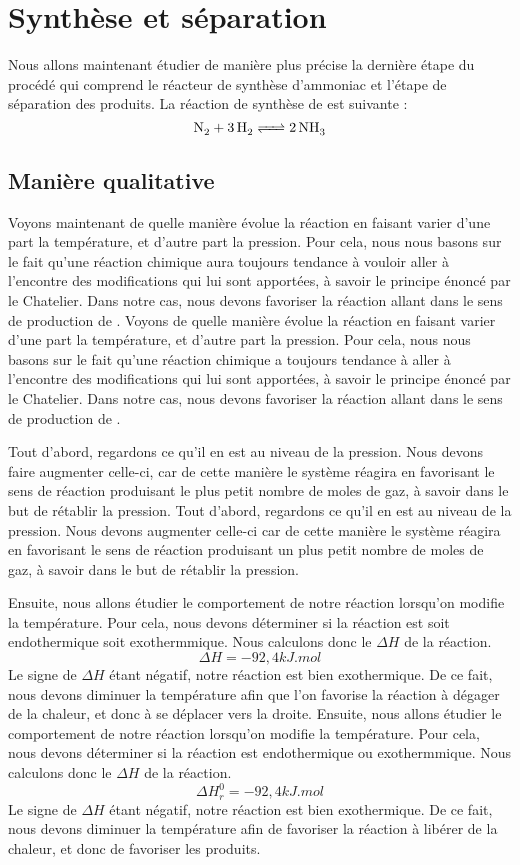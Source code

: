 \documentclass[10pt,a4paper]{article}
\begin{document}
\section{Synthèse  et séparation}

Nous allons maintenant étudier de manière plus précise la dernière étape du procédé qui comprend le réacteur de synthèse d’ammoniac et l'étape de séparation des produits.
La réaction de synthèse de  est suivante :
$$ \ce{N_2 + 3H2 <=> 2NH3}$$

\subsection{Manière qualitative}
Voyons maintenant de quelle manière évolue la réaction en faisant varier d'une part la température, et d'autre part la pression. Pour cela, nous nous basons sur le fait qu'une réaction chimique aura toujours tendance à vouloir aller à l'encontre des modifications qui lui sont apportées, à savoir le principe énoncé par le Chatelier. Dans notre cas, nous devons favoriser la réaction allant dans le sens de production de .
Voyons de quelle manière évolue la réaction en faisant varier d'une part la température, et d'autre part la pression. Pour cela, nous nous basons sur le fait qu'une réaction chimique a toujours tendance à   aller à l'encontre des modifications qui lui sont apportées, à savoir le principe énoncé par le Chatelier. Dans notre cas, nous devons favoriser la réaction allant dans le sens de production de .

Tout d'abord, regardons ce qu'il en est au niveau de la pression. Nous devons faire augmenter celle-ci, car de cette manière le système réagira en favorisant le sens de réaction produisant le plus petit nombre de moles de gaz, à savoir  dans le but de rétablir la pression. 
Tout d'abord, regardons ce qu'il en est au niveau de la pression. Nous devons augmenter celle-ci car de cette manière le système réagira en favorisant le sens de réaction produisant un plus petit nombre de moles de gaz, à savoir  dans le but de rétablir la pression. 

Ensuite, nous allons étudier le comportement de notre réaction lorsqu'on modifie la température. Pour cela, nous devons déterminer si la réaction est soit endothermique soit exothermmique. Nous calculons donc le $\Delta H$  de la réaction. $$\Delta H = \unit{-92,4}{kJ.mol}$$
Le signe de $\Delta H$ étant négatif, notre réaction est bien exothermique. De ce fait, nous devons diminuer la température afin que l'on favorise la réaction à dégager de la chaleur, et donc à se déplacer vers la droite.
Ensuite, nous allons étudier le comportement de notre réaction lorsqu'on modifie la température. Pour cela, nous devons déterminer si la réaction est endothermique ou exothermmique. Nous calculons donc le $\Delta H$  de la réaction. $$\Delta H^0_r = \unit{-92,4}{kJ.mol}$$
Le signe de $\Delta H$ étant négatif, notre réaction est bien exothermique. De ce fait, nous devons diminuer la température afin de favoriser la réaction à libérer de la chaleur, et donc de favoriser les produits.
\end{document}
